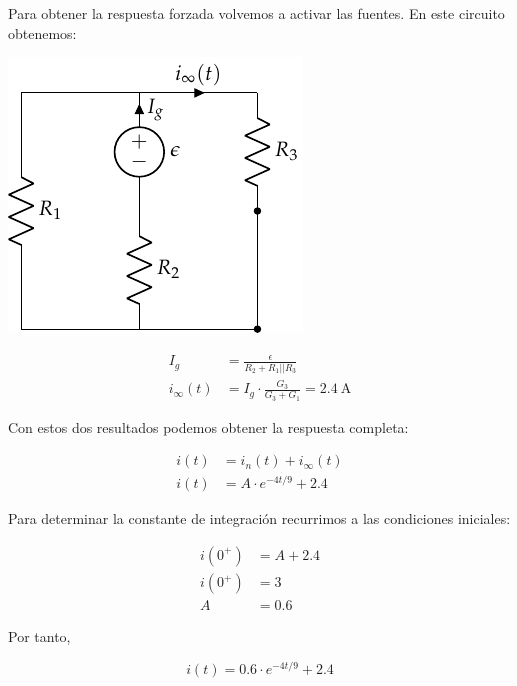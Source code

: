 \documentclass[12pt]{article}
\begin{document}
Para obtener la respuesta forzada volvemos a activar las fuentes. En
este circuito obtenemos:

\begin{minipage}{0.3\textwidth}
  \includegraphics{figs/FM_4_2_forzada}
\end{minipage}
\begin{minipage}{0.7\textwidth}
  \begin{align*}
    I_g &= \frac{\epsilon}{R_2 + R_1||R_3}\\
    i_\infty(t) &= I_g \cdot \frac{G_3}{G_3 + G_1} = \SI{2.4}{\ampere}
  \end{align*}
\end{minipage}

Con estos dos resultados podemos obtener la respuesta completa:

\begin{align*}
  i(t) &= i_n(t) + i_\infty(t)\\
  i(t) &= A \cdot e^{-4t/9} + 2.4
\end{align*}

Para determinar la constante de integración recurrimos a las
condiciones iniciales:

\begin{align*}
  i(0^+) &= A + 2.4\\
  i(0^+) &= 3\\
  A &= 0.6
\end{align*}

Por tanto,

\begin{equation*}
  i(t) = 0.6 \cdot e^{-4t/9} + 2.4
\end{equation*}

\clearpage

\subsection{}
\end{document}
